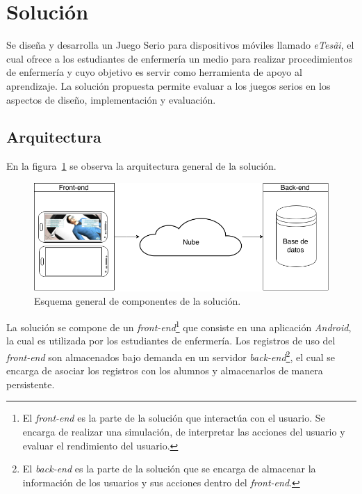 
\section{Solución}


Se diseña y desarrolla un Juego Serio para dispositivos móviles llamado
\textit{eTes\~{a}i}, el cual ofrece a los estudiantes de enfermería un medio para
realizar procedimientos de enfermería y cuyo objetivo es servir como herramienta
de apoyo al aprendizaje. La solución propuesta permite evaluar a los juegos
serios en los aspectos de diseño, implementación y evaluación.


\subsection{Arquitectura}

En la figura~\ref{fig:full_architecture} se observa la arquitectura general de la 
solución.

\begin{figure}[H]
\centering
\includegraphics[scale=0.29]{images/full.png}
\caption{Esquema general de componentes de la solución.}
\label{fig:full_architecture}
\end{figure}

La solución se compone de un \textit{front-end}\footnote{El \textit{front-end}
    es la parte de la solución que interactúa con el usuario. Se encarga de
    realizar una simulación, de interpretar las acciones del usuario y evaluar
    el rendimiento del usuario.} que consiste en una aplicación \textit{Android}, la cual
es utilizada por los estudiantes de enfermería. Los registros de uso del
\textit{front-end} son almacenados bajo demanda en un servidor
\textit{back-end}\footnote{El \textit{back-end} es la parte de la solución que
    se encarga de almacenar la información de los usuarios y sus acciones dentro
    del \textit{front-end}.}, el cual se encarga de asociar los registros con
los alumnos y almacenarlos de manera persistente.

